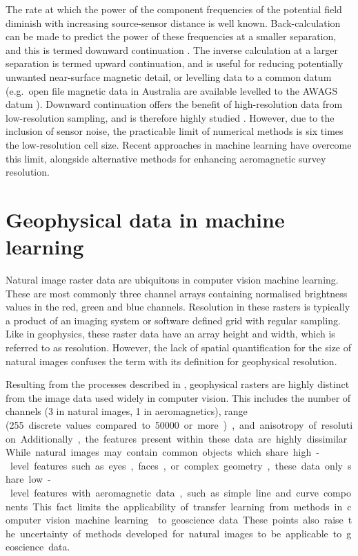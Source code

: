 The rate at which the power of the component frequencies of the potential field diminish with increasing source-sensor distance is well known.
Back-calculation can be made to predict the power of these frequencies at a smaller separation, and this is termed downward continuation \textcite{bullardDeterminationMassesNecessary1948,blakelyPotentialTheoryGravity1996}.
The inverse calculation at a larger separation is termed upward continuation, and is useful for reducing potentially unwanted near-surface magnetic detail, or levelling data to a common datum (e.g.\ open file magnetic data in Australia are available levelled to the AWAGS datum \parencite{mintyAirborneGeophysicalMapping2011}).
Downward continuation offers the benefit of high-resolution data from low-resolution sampling, and is therefore highly studied \parencite{zuoDownwardContinuationTransformation2020,fediStableDownwardContinuation2002,zhangNumericalSolutionsMeanValue2018,guoPotentialFieldContinuation2020,gangImprovedStableDownward2018,pilkingtonPotentialFieldContinuation2017}.
However, due to the inclusion of sensor noise, the practicable limit of numerical methods is six times the low-resolution cell size.
Recent approaches in machine learning have overcome this limit, alongside alternative methods for enhancing aeromagnetic survey resolution.

\section{Geophysical data in machine learning}
\label{sec:introdata}
Natural image raster data are ubiquitous in computer vision machine learning.
These are most commonly three channel arrays containing normalised brightness values in the red, green and blue channels.
Resolution in these rasters is typically a product of an imaging system or software defined grid with regular sampling.
Like in geophysics, these raster data have an array height and width, which is referred to as resolution.
However, the lack of spatial quantification for the size of natural images confuses the term with its definition for geophysical resolution.

Resulting from the processes described in , geophysical rasters are highly distinct from the image data used widely in computer vision.
This includes the number of channels (3 in natural images, 1 in aeromagnetics), range (\qty{255} discrete values compared to \qty{50000} or more), and anisotropy of resolution.
Additionally, the features present within these data are highly dissimilar.
While natural images may contain common objects which share high-level features such as eyes, faces, or complex geometry, these data only share low-level features with aeromagnetic data, such as simple line and curve components.
This fact limits the applicability of transfer learning from methods in computer vision machine learning \parencite{tanSurveyDeepTransfer2018} to geoscience data.
These points also raise the uncertainty of methods developed for natural images to be  applicable to geoscience data.

